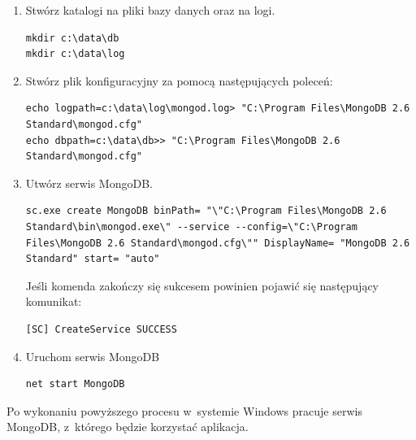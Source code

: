 \documentclass[8pt,a4paper,notitlepage]{article}
\begin{document}
\begin{enumerate}
\item Stwórz katalogi na pliki bazy danych oraz na logi.
\begin{lstlisting}
mkdir c:\data\db
mkdir c:\data\log
\end{lstlisting}
\newpage
\item Stwórz plik konfiguracyjny za pomocą następujących poleceń:
\begin{lstlisting}
echo logpath=c:\data\log\mongod.log> "C:\Program Files\MongoDB 2.6 Standard\mongod.cfg"
echo dbpath=c:\data\db>> "C:\Program Files\MongoDB 2.6 Standard\mongod.cfg"
\end{lstlisting}

\item Utwórz serwis MongoDB.
\begin{lstlisting}
sc.exe create MongoDB binPath= "\"C:\Program Files\MongoDB 2.6 Standard\bin\mongod.exe\" --service --config=\"C:\Program Files\MongoDB 2.6 Standard\mongod.cfg\"" DisplayName= "MongoDB 2.6 Standard" start= "auto"
\end{lstlisting}
Jeśli komenda zakończy się sukcesem powinien pojawić się następujący komunikat:
\begin{lstlisting}
[SC] CreateService SUCCESS
\end{lstlisting}

\item Uruchom serwis MongoDB
\begin{lstlisting}
net start MongoDB
\end{lstlisting}

\end{enumerate}

\par Po wykonaniu powyższego procesu w~systemie Windows pracuje serwis MongoDB, z~którego będzie korzystać aplikacja.
\end{document}
